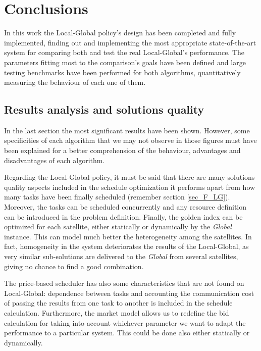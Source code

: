 
\chapter{Conclusions} %

\label{Chapter5} %


In this work the Local-Global policy's design has been completed and fully implemented, finding out and implementing the most appropriate state-of-the-art system for comparing both and test the real Local-Global's performance. The parameters fitting most to the comparison's goals have been defined and large testing benchmarks have been performed for both algorithms, quantitatively measuring the behaviour of each one of them.

\section{Results analysis and solutions quality}

In the last section the most significant results have been shown. However, some specificities of each algorithm that we may not observe in those figures must have been explained for a better comprehension of the behaviour, advantages and disadvantages of each algorithm.

Regarding the Local-Global policy, it must be said that there are many solutions quality aspects included in the schedule optimization it performs apart from how many tasks have been finally scheduled (remember section \ref{sec_F_LG}). Moreover, the tasks can be scheduled concurrently and any resource definition can be introduced in the problem definition. Finally, the golden index can be optimized for each satellite, either statically or dynamically by the \emph{Global} instance. This can model much better the heterogeneity among the satellites. In fact, homogeneity in the system deteriorates the results of the Local-Global, as very similar sub-solutions are delivered to the \emph{Global} from several satellites, giving no chance to find a good combination.

The price-based scheduler has also some characteristics that are not found on Local-Global: dependence between tasks and accounting the communication cost of passing the results from one task to another is included in the schedule calculation. Furthermore, the market model allows us to redefine the bid calculation for taking into account whichever parameter we want to adapt the performance to a particular system. This could be done also either statically or dynamically.

